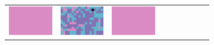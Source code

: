 \documentclass{ipol}
\begin{document}
\begin{figure}[ht]
\begin{subfigure}[t]{\linewidth}
\begin{tabular}{ccccccccc}
                \includegraphics[width=\s]{images/tower/DCB/bid_n5_256_grids.png}&
                \includegraphics[width=\s]{images/tower/DHT/bid_n5_256_grids.png}&
                \includegraphics[width=\s]{images/tower/LINEAR/bid_n5_256_grids.png}&

\end{tabular}
\end{subfigure}
\end{figure}
\end{document}
